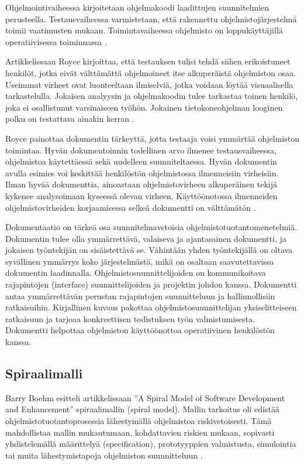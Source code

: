 \documentclass[finnish]{tktltiki2}
\theoremstyle{definition}
\theoremstyle{remark}
\begin{document}
Ohjelmointivaiheessa kirjoitetaan ohjelmakoodi laadittujen suunnitelmien perusteella. Testausvaiheessa varmistetaan, että rakennettu ohjelmistojärjestelmä toimii vaatimusten mukaan. Toimintavaiheessa ohjelmisto on loppukäyttäjillä operatiivisessa toiminnassa \cite{ROY70}. 

Artikkelissaan Royce kirjoittaa, että testauksen tulisi tehdä siihen erikoistuneet henkilöt, jotka eivät välttämättä ohjelmoineet itse alkuperäistä ohjelmiston osaa. Useimmat virheet ovat luonteeltaan ilmiselviä, jotka voidaan löytää visuaalisella tarkastelulla. Jokaisen analyysin ja ohjelmakoodin tulee tarkastaa toinen henkilö, joka ei osallistunut varsinaiseen työhön. Jokainen tietokoneohjelman looginen polku on testattava ainakin kerran \cite{ROY70}.

Royce painottaa dokumentin tärkeyttä, jotta testaaja voisi ymmärtää ohjelmiston toimintaa. Hyvän dokumentoinnin todellinen arvo ilmenee testausvaiheessa, ohjelmistoa käytettäessä sekä uudelleen suunniteltaessa. Hyvän dokumentin avulla esimies voi keskittää henkilöstön ohjelmistossa ilmenneisiin virheisiin. Ilman hyvää dokumenttia, ainoastaan ohjelmistovirheen alkuperäinen tekijä kykenee analysoimaan kyseessä olevan virheen. Käyttöönotossa ilmenneiden ohjelmistovirheiden korjaamisessa selkeä dokumentti on välttämätön \cite{ROY70}.

Dokumentaatio on tärkeä osa suunnitelmavetoisia ohjelmistotuotantomenetelmiä. Dokumentin tulee olla ymmärrettävä, valaiseva ja ajantasainen dokumentti, ja jokaisen työntekijän on sisäistettävä se. Vähintään yhden työntekijällä on oltava syvällinen ymmärrys koko järjestelmästä, mikä on osaltaan saavutettavissa dokumentin laadinnalla. Ohjelmistosuunnittelijoiden on kommunikoitava rajapintojen (interface) suunnittelijoiden ja projektin johdon kanssa. Dokumentti antaa ymmärrettävän perustan rajapintojen suunnitteluun ja hallinnollisiin ratkaisuihin. Kirjallinen kuvaus pakottaa ohjelmistosuunnittelijan yksiselitteiseen ratkaisuun ja tarjoaa konkreettisen todistuksen työn valmistumisesta. Dokumentti helpottaa ohjelmiston käyttöönottoa operatiivinen henkilöstön kanssa.  	  

\subsection{Spiraalimalli}

Barry Boehm esitteli artikkelissaan ''A Spiral Model of Software Development and Enhancement'' spiraalimallin (spiral model). Mallin tarkoitus oli edistää ohjelmistotuotantoprosessia lähestymällä ohjelmistoa riskivetoisesti. Tämä mahdollistaa mallin mukautumaan, kohdattavien riskien mukaan, sopivasti yhdistelemällä määrittelyä (specification), prototyyppien valmistusta, simulointia tai muita lähestymistapoja ohjelmiston suunnitteluun \cite{BOE88}.
\end{document}
